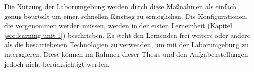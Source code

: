 Die Nutzung der Laborumgebung werden durch diese Maßnahmen als einfach genug beurteilt um einen schnellen Einstieg zu ermöglichen.
Die Konfigurationen, die vorgenommen werden müssen, werden in der ersten Lerneinheit (Kapitel \ref{sec:learning-unit-1}) beschrieben.
Es steht den Lernenden frei weitere oder andere als die beschriebenen Technologien zu verwenden, um mit der Laborumgebung zu interagieren.
Diese können im Rahmen dieser Thesis und den Aufgabenstellungen jedoch nicht berücksichtigt werden.

\pagebreak